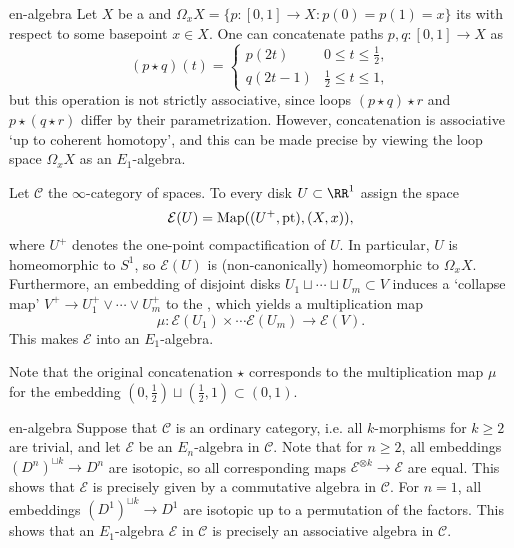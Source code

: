 \begin{example}{en-algebra}
    Let $X$ be a  and $\Omega_x X = \{ p : [0, 1] \to X : p(0) = p(1) = x \}$ its  with respect to some basepoint $x \in X$. One can concatenate paths $p, q : [0, 1] \to X$ as
    \[ (p \star q)(t) = \left\{ \begin{array}{cl}
         p(2t) & 0 \le t \le \tfrac{1}{2} , \\
         q(2t - 1) & \tfrac{1}{2} \le t \le 1 ,
    \end{array} \right. \]
    but this operation is not strictly associative, since loops $(p \star q) \star r$ and $p \star (q \star r)$ differ by their parametrization. However, concatenation is associative `up to coherent homotopy', and this can be made precise by viewing the loop space $\Omega_x X$ as an $E_1$-algebra.
    
    Let $\mathcal{C}$ the $\infty$-category of spaces. To every disk $U \subset \RR^1$ assign the space
    \[ \mathcal{E}(U) = \textup{Map}((U^+, \textup{pt}), (X, x)) , \]
    where $U^+$ denotes the one-point compactification of $U$. In particular, $U$ is homeomorphic to $S^1$, so $\mathcal{E}(U)$ is (non-canonically) homeomorphic to $\Omega_x X$. Furthermore, an embedding of disjoint disks $U_1 \sqcup \cdots \sqcup U_m \subset V$ induces a `collapse map' $V^+ \to U_1^+ \vee \cdots \vee U_m^+$ to the , which yields a multiplication map
    \[ \mu : \mathcal{E}(U_1) \times \cdots \mathcal{E}(U_m) \to \mathcal{E}(V) . \]
    This makes $\mathcal{E}$ into an $E_1$-algebra.
    
    Note that the original concatenation $\star$ corresponds to the multiplication map $\mu$ for the embedding $(0, \tfrac{1}{2}) \sqcup (\tfrac{1}{2}, 1) \subset (0, 1)$.
\end{example}

\begin{example}{en-algebra}
    Suppose that $\mathcal{C}$ is an ordinary category, i.e. all $k$-morphisms for $k \ge 2$ are trivial, and let $\mathcal{E}$ be an $E_n$-algebra in $\mathcal{C}$. Note that for $n \ge 2$, all embeddings $(D^n)^{\sqcup k} \to D^n$ are isotopic, so all corresponding maps $\mathcal{E}^{\otimes k} \to \mathcal{E}$ are equal. This shows that $\mathcal{E}$ is precisely given by a commutative algebra in $\mathcal{C}$. For $n = 1$, all embeddings $(D^1)^{\sqcup k} \to D^1$ are isotopic up to a permutation of the factors. This shows that an $E_1$-algebra $\mathcal{E}$ in $\mathcal{C}$ is precisely an associative algebra in $\mathcal{C}$.
\end{example}


